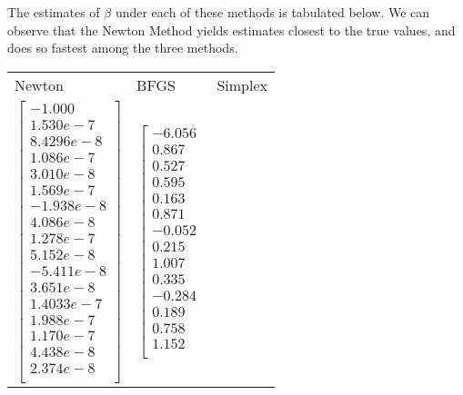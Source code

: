 \documentclass[landscape]{article} %
\theoremstyle{definition}
\begin{document}
\begin{enumerate}
	
	
		The estimates of $ \beta $ under each of these methods is tabulated below. We can observe that the Newton Method yields estimates closest to the true values, and does so fastest among the three methods.
		
		\begin{tabular}{p{10em }p{10em } p{10em}} 
			\hline
			 Newton& BFGS& Simplex \\
			 \begin{equation*}
			 	\left[
			 	\begin{array}{c}
			 		-1.000 \\
			 		1.530e-7 \\
			 		8.4296e-8 \\
			 		1.086e-7 \\
			 		3.010e-8 \\
			 		1.569e-7 \\
			 		-1.938e-8 \\
			 		4.086e-8 \\
			 		1.278e-7 \\
			 		5.152e-8 \\
			 		-5.411e-8 \\
			 		3.651e-8 \\
			 		1.4033e-7 \\
			 		1.988e-7 \\
			 		1.170e-7 \\
			 		4.438e-8 \\
			 		2.374e-8 \\
			 	\end{array}
			 	\right]
			 \end{equation*} & 
		 	\begin{equation*}
		 		\left[
		 		\begin{array}{c}
		 			-6.056 \\
		 			0.867 \\
		 			0.527 \\
		 			0.595 \\
		 			0.163 \\
		 			0.871 \\
		 			-0.052 \\
		 			0.215 \\
		 			1.007 \\
		 			0.335 \\
		 			-0.284 \\
		 			0.189 \\
		 			0.758 \\
		 			1.152 \\

\end{array}
\end{equation*}
\end{tabular}
\end{enumerate}
\end{document}
